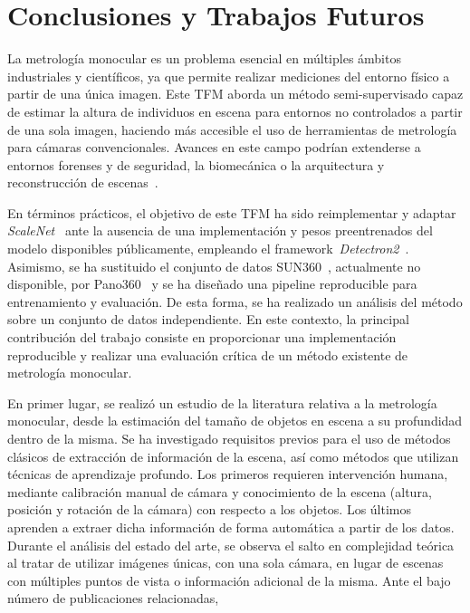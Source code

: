\chapter{Conclusiones y Trabajos Futuros}
La metrología monocular es un problema esencial en múltiples ámbitos industriales y
científicos, ya que permite realizar mediciones del entorno físico a partir de una única imagen. Este TFM aborda un método semi-supervisado
capaz de estimar la altura de individuos en escena para entornos no controlados a partir de una sola imagen,
haciendo más accesible el uso de herramientas de metrología para cámaras convencionales. Avances en este
campo podrían extenderse a entornos forenses y de seguridad, la biomecánica o la arquitectura y reconstrucción de escenas~\cite{HoiemPopUp,HoiemObjectsInPerspective,CriminisiApplications, CriminisiReconstruction, CriminisiPaintings, SingleViewExerciseQuantification, ObjectsIntoPhotos}.
\par
En términos prácticos, el objetivo de este TFM ha sido reimplementar y adaptar \emph{ScaleNet}~\cite{SVMIW} ante la
ausencia de una implementación y pesos preentrenados del modelo disponibles públicamente,
empleando el framework~\emph{Detectron2}~\cite{detectron2}. Asimismo, se ha sustituido
el conjunto de datos SUN360~\cite{SUN360}, actualmente no disponible, por Pano360~\cite{SPEC} y se ha diseñado
una pipeline reproducible para entrenamiento y evaluación.
De esta forma, se ha realizado un análisis del método sobre un conjunto de datos
independiente. En este contexto, la principal contribución del trabajo consiste en proporcionar
una implementación reproducible y realizar una evaluación crítica de un método existente de metrología monocular.
\par
En primer lugar, se realizó un estudio de la literatura relativa a la metrología monocular, desde la
estimación del tamaño de objetos en escena a su profundidad dentro de la misma.
Se ha investigado requisitos previos para el uso de métodos clásicos de extracción de información de la escena,
así como métodos que utilizan técnicas de aprendizaje profundo.
Los primeros requieren intervención humana, mediante calibración manual de cámara y conocimiento de la escena
(altura, posición y rotación de la cámara) con respecto a los objetos. Los últimos
aprenden a extraer dicha información de forma automática a partir de los datos.
Durante el análisis del estado del arte, se observa el salto en complejidad teórica al tratar de
utilizar imágenes únicas, con una sola cámara, en lugar de escenas con múltiples puntos de vista
o información adicional de la misma. Ante el bajo número de publicaciones relacionadas,
